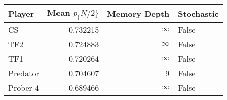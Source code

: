 \begin{tabular}{lrrl}
\toprule
   Player &  Mean $p_\{N/2\}$ &  Memory Depth & Stochastic \\
\midrule
       CS &        0.732215 &            \(\infty\) &      False \\
      TF2 &        0.724883 &            \(\infty\) &      False \\
      TF1 &        0.720264 &            \(\infty\) &      False \\
 Predator &        0.704607 &             9 &      False \\
 Prober 4 &        0.689466 &            \(\infty\) &      False \\
\bottomrule
\end{tabular}
